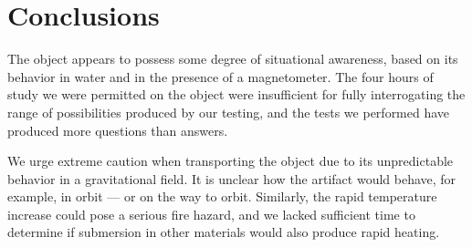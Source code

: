 \documentclass[10pt]{article}
\begin{document}
\section{Conclusions}\label{conclusions}
The object appears to possess some degree of situational awareness, based on its behavior in water and in the presence of a magnetometer.
The four hours of study we were permitted on the object were insufficient for fully interrogating the range of possibilities produced by our testing, and the tests we performed have produced more questions than answers.

We urge extreme caution when transporting the object due to its unpredictable behavior in a gravitational field.
It is unclear how the artifact would behave, for example, in orbit --- or on the way to orbit.
Similarly, the rapid temperature increase could pose a serious fire hazard, and we lacked sufficient time to determine if submersion in other materials would also produce rapid heating.

%
%
\end{document}
